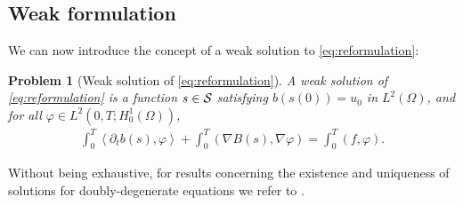 \documentclass[review,11pt]{article}
\numberwithin{equation}{section}
\newtheorem{problem}{Problem}
\newcommand\KM[1]{%
  \protect\leavevmode
  \begingroup
        \color{red!55!yellow}%
        #1%
  \endgroup
}
\begin{document}
\subsection{Weak formulation}
We can now introduce the concept of a weak solution to \eqref{eq:reformulation}:

\begin{problem}[{Weak solution of \eqref{eq:reformulation}}]\label{eq:reformulated_weak_form}
A weak solution of \eqref{eq:reformulation} is a function $s \in \cal S$ satisfying $b(s(0))=u_0$ in $L^2(\Omega)$, and for all $\varphi\in L^2(0,T;H_0^1(\Omega))$,
    \begin{align}\label{eq:weak form}
    \int_0^T\left\langle \partial_t b(s), \varphi\right\rangle+ \int_0^T\left(\nabla B(s), \nabla \varphi\right) = \int_0^T\left( f, \varphi\right).
\end{align}
\end{problem} 
Without being exhaustive, for results concerning the existence and uniqueness of solutions for doubly-degenerate equations we refer to \cite{alt1983quasilinear, ANDREIANOV20173633,CarilloEntropy,CARRILLO199993,DroniouEymardTalbot,LuJaeger, pop2011regularization,ZouExistence}. 
\end{document}
